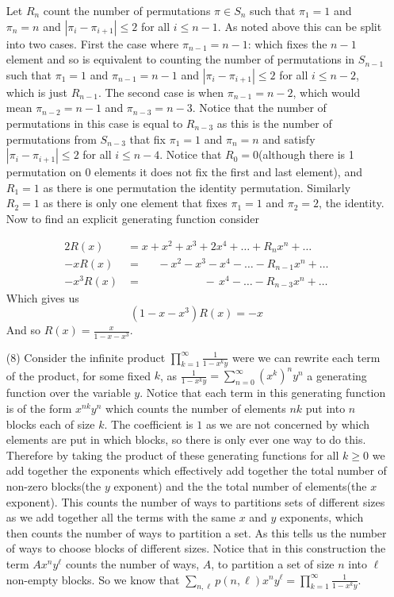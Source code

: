 \documentclass[12pt]{amsart}
\theoremstyle{definition}
\begin{document}
\begin{itemize}
Let $R_n$ count the number of permutations $\pi\in S_n$ such that $\pi_1=1$ and $\pi_n=n$ and $|\pi_i-\pi_{i+1}|\leq 2$ for all $i\leq n-1$. As noted above this can be split into two cases. First the case where $\pi_{n-1}=n-1$: which fixes the $n-1$ element and so is equivalent to counting the number of permutations in $S_{n-1}$ such that $\pi_1=1$ and $\pi_{n-1}=n-1$ and $|\pi_i-\pi_{i+1}|\leq 2$ for all $i\leq n-2$, which is just $R_{n-1}$. The second case is when $\pi_{n-1}=n-2$, which would mean $\pi_{n-2}=n-1$ and $\pi_{n-3}=n-3$. Notice that the number of permutations in this case is equal to $R_{n-3}$ as this is the number of permutations from $S_{n-3}$ that fix $\pi_1=1$ and $\pi_n=n$ and satisfy $|\pi_i-\pi_{i+1}|\leq 2$ for all $i\leq n-4$. Notice that $R_0=0$(although there is 1 permutation on $0$ elements it does not fix the first and last element), and $R_1=1$ as there is one permutation the identity permutation. Similarly $R_2=1$ as there is only one element that fixes $\pi_1=1$ and $\pi_2=2$, the identity.\\

Now to find an explicit generating function consider 

\begin{align*}{2}
    R(x)&=x+x^2+x^3+2x^4+\dots+R_nx^n+\dots\\
    -xR(x)&=\;\;\;\;\;-x^2-x^3-x^4-\dots-R_{n-1}x^n+\dots\\
    -x^3R(x)&=\;\;\;\;\;\;\;\;\;\;\;\;\;\;\;\;\;\;\;\;-\,x^4-\dots-R_{n-3}x^n+\dots
\end{align*}
Which gives us
    $$(1-x-x^3)R(x)=-x$$
And so $R(x)=\displaystyle{\frac{x}{1-x-x^3}}$.\\
    


\item[(8)] %
Consider the infinite product $\displaystyle{\prod_{k=1}^\infty\frac{1}{1-x^ky}}$ were we can rewrite each term of the product, for some fixed $k$, as $\displaystyle{\frac{1}{1-x^ky}}=\displaystyle{\sum_{n=0}^\infty (x^k)^ny^n}$ a generating function over the variable $y$. Notice that each term in this generating function is of the form $x^{nk}y^n$ which counts the number of elements $nk$ put into $n$ blocks each of size $k$. The coefficient is $1$ as we are not concerned by which elements are put in which blocks, so there is only ever one way to do this. Therefore by taking the product of these generating functions for all $k\geq 0$ we add together the exponents which effectively add together the total number of non-zero blocks(the $y$ exponent) and the the total number of elements(the $x$ exponent). This counts the number of ways to partitions sets of different sizes as we add together all the terms with the same $x$ and $y$ exponents, which then counts the number of ways to partition a set. As this tells us the number of ways to choose blocks of different sizes. Notice that in this construction the term $Ax^n y^\ell$ counts the number of ways, $A$, to partition a set of size $n$ into $\ell$ non-empty blocks. So we know that $\displaystyle{\sum_{n,\ell}p(n,\ell)x^ny^\ell}=\displaystyle{\prod_{k=1}^\infty\frac{1}{1-x^ky}}$.\\


\end{itemize}
\end{document}
